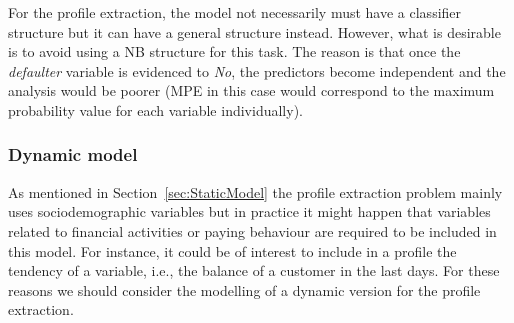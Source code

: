 



%

For the profile extraction, the model not necessarily must have a classifier structure but it can have a general structure instead. However, what is desirable is to avoid using a NB structure for this task. The reason is that once the \emph{defaulter} variable is evidenced to \emph{No}, the predictors become independent and the analysis would be poorer (MPE in this case would correspond to the maximum probability value for each variable individually).



\subsubsection*{Dynamic model}

As mentioned in Section~\ref{sec:StaticModel} the profile extraction problem mainly uses sociodemographic variables but in practice it might happen that variables related to financial activities or paying behaviour are required to be included in this model.  For instance, it could be of interest to include in a profile the tendency of a variable, i.e., the balance of a customer in the last days. For these reasons we should consider the modelling of a dynamic version for the profile extraction. 

